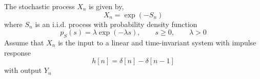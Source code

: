 \ifspanish

\else

The stochastic process  $X_n$ is given by,
\[X_n = \exp\left(- S_n \right)\]
where $S_n$ is an i.i.d. process with probability density function
\[p_S(s) = \lambda \exp(- \lambda s),  \qquad s \ge 0, \qquad \lambda > 0\]
Assume that $X_n$ is the input to a linear and time-invariant system with impulse response
\[h[n] = \delta[n] - \delta[n-1]\]
with output $Y_n$


